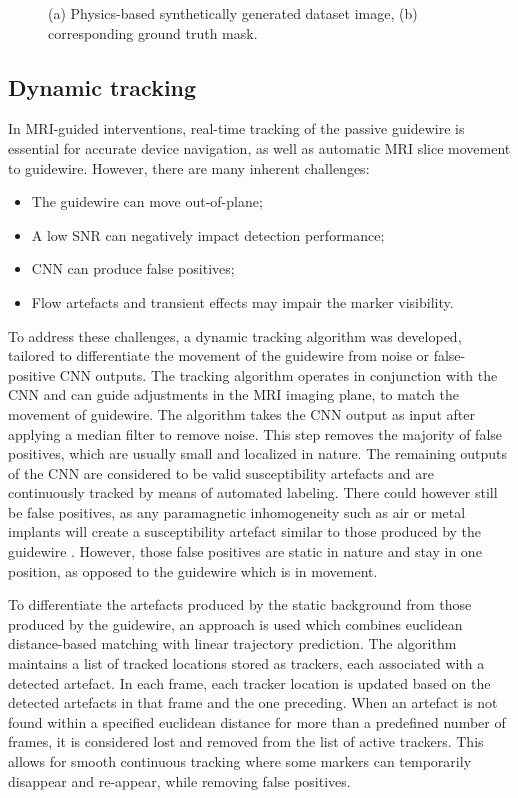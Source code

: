 \documentclass[conference]{IEEEtran}
\begin{document}
\begin{figure}[h]
\begin{minipage}{0.241\textwidth}
    \end{minipage}\hfill \hspace*{0cm}
    \caption{(a) Physics-based synthetically generated dataset image,
    (b) corresponding ground truth mask.}
    \label{fig:generated-dataset-and-truth}
\end{figure}

\subsection{Dynamic tracking}\label{guidewire-tracking}
In MRI-guided interventions, real-time tracking of the passive guidewire is essential for accurate device navigation, as well as automatic MRI slice movement to guidewire. However, there are many inherent challenges:
\begin{itemize}
    \item The guidewire can move out-of-plane;
    \item A low SNR can negatively impact detection performance;
    \item CNN can produce false positives;
    \item Flow artefacts and transient effects may impair the marker visibility.
\end{itemize}

To address these challenges, a dynamic tracking algorithm was developed, tailored to differentiate the movement of the guidewire from noise or false-positive CNN outputs. The tracking algorithm operates in conjunction with the CNN and can guide adjustments in the MRI imaging plane, to match the movement of guidewire. The algorithm takes the CNN output as input after applying a median filter to remove noise. This step removes the majority of false positives, which are usually small and localized in nature. The remaining outputs of the CNN are considered to be valid susceptibility artefacts and are continuously tracked by means of automated labeling. There could however still be false positives, as any paramagnetic inhomogeneity such as air or metal implants will create a susceptibility artefact similar to those produced by the guidewire \cite{pmid22162977}. However, those false positives are static in nature and stay in one position, as opposed to the guidewire which is in movement.

To differentiate the artefacts produced by the static background from those produced by the guidewire, an approach is used which combines euclidean distance-based matching with linear trajectory prediction. The algorithm maintains a list of tracked locations stored as trackers, each associated with a detected artefact. In each frame, each tracker location is updated based on the detected artefacts in that frame and the one preceding. When an artefact is not found within a specified euclidean distance for more than a predefined number of frames, it is considered lost and removed from the list of active trackers. This allows for smooth continuous tracking where some markers can temporarily disappear and re-appear, while removing false positives.
\end{document}
